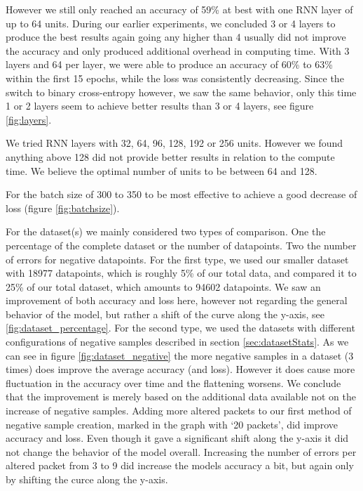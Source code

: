 \documentclass[
	ngerman,
	ruledheaders=section,%
	class=report,%
	thesis={type=bachelor},%
	accentcolor=9c,%
	custommargins=true,%
	marginpar=false,%
	parskip=half-,%
	fontsize=11pt,%
]{tudapub}
\begin{document}
However we still only reached an accuracy of 59\% at best with one RNN layer of up to 64 units.
During our earlier experiments, we concluded 3 or 4 layers to produce the best results again going any higher than 4 usually did not improve the accuracy and only produced additional overhead in computing time.
With 3 layers and 64 per layer, we were able to produce an accuracy of 60\% to 63\% within the first 15 epochs, while the loss was consistently decreasing.
Since the switch to binary cross-entropy however, we saw the same behavior, only this time 1 or 2 layers seem to achieve better results than 3 or 4 layers, see figure \ref{fig:layers}.

We tried RNN layers with 32, 64, 96, 128, 192 or 256 units.
However we found anything above 128 did not provide better results in relation to the compute time.
We believe the optimal number of units to be between 64 and 128.

For the batch size of 300 to 350 to be most effective to achieve a good decrease of loss (figure \ref{fig:batchsize}).

For the dataset(s) we mainly considered two types of comparison.
One the percentage of the complete dataset or the number of datapoints.
Two the number of errors for negative datapoints.
For the first type, we used our smaller dataset with 18977 datapoints, which is roughly 5\% of our total data, and compared it to 25\% of our total dataset, which amounts to 94602 datapoints.
We saw an improvement of both accuracy and loss here, however not regarding the general behavior of the model, but rather a shift of the curve along the y-axis, see \ref{fig:dataset_percentage}.
For the second type, we used the datasets with different configurations of negative samples described in section \ref{sec:datasetStats}.
As we can see in figure \ref{fig:dataset_negative} the more negative samples in a dataset (3 times) does improve the average accuracy (and loss).
However it does cause more fluctuation in the accuracy over time and the flattening worsens.
We conclude that the improvement is merely based on the additional data available not on the increase of negative samples.
Adding more altered packets to our first method of negative sample creation, marked in the graph with `20 packets', did improve accuracy and loss.
Even though it gave a significant shift along the y-axis it did not change the behavior of the model overall.
Increasing the number of errors per altered packet from 3 to 9 did increase the models accuracy a bit, but again only by shifting the curce along the y-axis.
\end{document}
